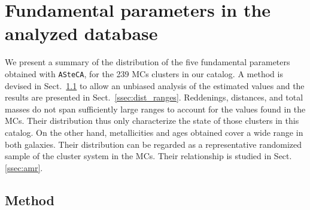 \documentclass{aa}
\begin{document}

\section{Fundamental parameters in the analyzed database}
\label{sec:param-dist}

We present a summary of the distribution of the five fundamental parameters
obtained with \texttt{ASteCA}, for the 239 MCs clusters in our catalog.
%
A method is devised in Sect.~\ref{ssec:kde_method} to allow an unbiased analysis
of the estimated values and the results are presented in
Sect.~\ref{ssec:dist_ranges}. Reddenings, distances, and total masses do not
span sufficiently large ranges to account for the values found in the MCs. Their
distribution thus only characterize the state of those clusters in this catalog.
%
On the other hand, metallicities and ages obtained cover a wide range in both
galaxies. Their distribution can be regarded as a representative randomized
sample of the cluster system in the MCs. Their relationship is studied in
Sect.\ref{ssec:amr}.

%




\subsection{Method}
\label{ssec:kde_method}
\end{document}
